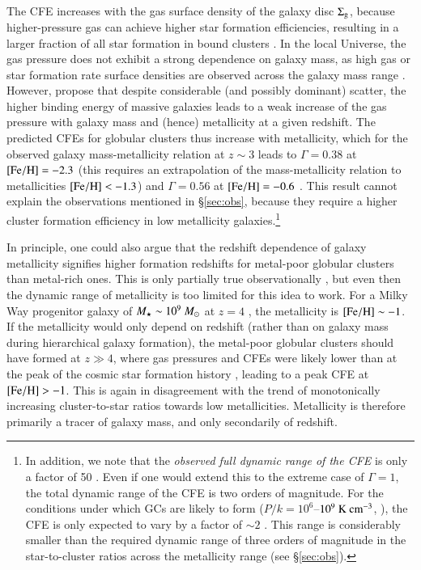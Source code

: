 \documentclass{aa}
\begin{document}
The CFE increases with the gas surface density of the galaxy disc $\Sigma_{\rm g}$, because higher-pressure gas can achieve higher star formation efficiencies, resulting in a larger fraction of all star formation in bound clusters \citep{kruijssen12d}. In the local Universe, the gas pressure does not exhibit a strong dependence on galaxy mass, as high gas or star formation rate surface densities are observed across the galaxy mass range \citep[see e.g.~the compilation by][]{adamo15b}. However, \citet[Table~1]{kruijssen15b} propose that despite considerable (and possibly dominant) scatter, the higher binding energy of massive galaxies leads to a weak increase of the gas pressure with galaxy mass and (hence) metallicity at a given redshift. 
The predicted CFEs for globular clusters thus increase with metallicity, which for the observed galaxy mass-metallicity relation at $z\sim3$ \citep{mannucci09} leads to $\Gamma=0.38$ at ${\rm [Fe/H]}=-2.3$ (this requires an extrapolation of the mass-metallicity relation to metallicities ${\rm [Fe/H]}<-1.3$) and $\Gamma=0.56$ at ${\rm [Fe/H]}=-0.6$ \citep{kruijssen15b}.
 This result cannot explain the observations mentioned in \S\ref{sec:obs}, because they require a higher cluster formation efficiency in low metallicity galaxies.\footnote{
In addition, we note that the {\it observed full dynamic range of the CFE} is only a factor of 50 \citep[e.g.][]{goddard10,adamo15b,johnson16}. Even if one would extend this to the extreme case of $\Gamma=1$, the total dynamic range of the CFE is two orders of magnitude. For the conditions under which GCs are likely to form ($P/k=10^6$--$10^9~{\rm K}~{\rm cm}^{-3}$, \citealt{elmegreen97}), the CFE is only expected to vary by a factor of $\sim2$ \citep[$\Gamma=0.3$--$0.6$,][]{kruijssen12d}. This range is considerably smaller than the required dynamic range of three orders of magnitude in the star-to-cluster ratios across the metallicity range (see \S\ref{sec:obs}).}

In principle, one could also argue that the redshift dependence of galaxy metallicity signifies higher formation redshifts for metal-poor globular clusters than metal-rich ones. This is only partially true observationally \citep[e.g.][]{forbes10}, but even then the dynamic range of metallicity is too limited for this idea to work. For a Milky Way progenitor galaxy of $M_\star\sim10^9~\mbox{$M_{\odot}$}$ at $z=4$ \citep[cf.][]{moster13}, the metallicity is ${\rm [Fe/H]}\sim-1$. If the metallicity would only depend on redshift (rather than on galaxy mass during hierarchical galaxy formation), the metal-poor globular clusters should have formed at $z\gg4$, where gas pressures and CFEs were likely lower than at the peak of the cosmic star formation history \citep[$z\sim2$, e.g.][]{madau14}, leading to a peak CFE at ${\rm [Fe/H]}>-1$. This is again in disagreement with the trend of monotonically increasing cluster-to-star ratios towards low metallicities. Metallicity is therefore primarily a tracer of galaxy mass, and only secondarily of redshift.
\end{document}
